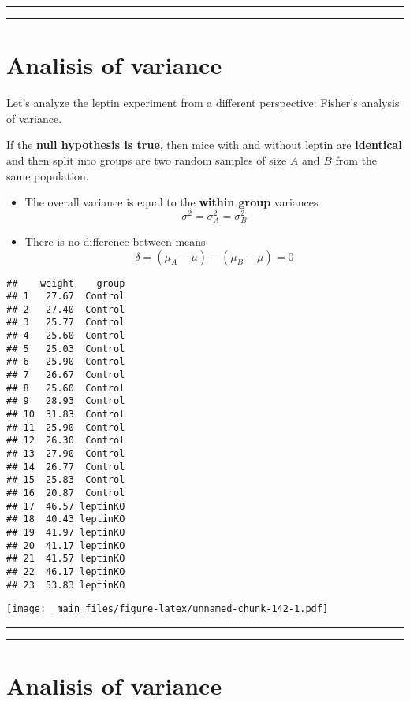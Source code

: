 \documentclass[
]{book}
\begin{document}
\begin{center}\rule{0.5\linewidth}{0.5pt}\end{center}

\begin{center}\rule{0.5\linewidth}{0.5pt}\end{center}

\hypertarget{analisis-of-variance}{%
\section{Analisis of variance}\label{analisis-of-variance}}

Let's analyze the leptin experiment from a different perspective: Fisher's analysis of variance.

If the \textbf{null hypothesis is true}, then mice with and without leptin are \textbf{identical} and then split into groups are two random samples of size \(A\) and \(B\) from the same population.

\begin{itemize}
\item
  The overall variance is equal to the \textbf{within group} variances \[\sigma^2=\sigma^2_A=\sigma^2_B\]
\item
  There is no difference between means \[\delta=(\mu_A-\mu)-(\mu_B-\mu)=0\]
\end{itemize}

\begin{verbatim}
##    weight    group
## 1   27.67  Control
## 2   27.40  Control
## 3   25.77  Control
## 4   25.60  Control
## 5   25.03  Control
## 6   25.90  Control
## 7   26.67  Control
## 8   25.60  Control
## 9   28.93  Control
## 10  31.83  Control
## 11  25.90  Control
## 12  26.30  Control
## 13  27.90  Control
## 14  26.77  Control
## 15  25.83  Control
## 16  20.87  Control
## 17  46.57 leptinKO
## 18  40.43 leptinKO
## 19  41.97 leptinKO
## 20  41.17 leptinKO
## 21  41.57 leptinKO
## 22  46.17 leptinKO
## 23  53.83 leptinKO
\end{verbatim}

\texttt{[image: \_main\_files/figure-latex/unnamed-chunk-142-1.pdf]}

\begin{center}\rule{0.5\linewidth}{0.5pt}\end{center}

\begin{center}\rule{0.5\linewidth}{0.5pt}\end{center}

\hypertarget{analisis-of-variance-1}{%
\section{Analisis of variance}\label{analisis-of-variance-1}}
\end{document}

